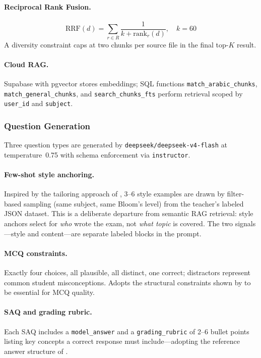 \documentclass[12pt, a4paper]{article}
\begin{document}
\paragraph{Reciprocal Rank Fusion.}
\begin{equation}
  \mathrm{RRF}(d) = \sum_{r \in R} \frac{1}{k + \mathrm{rank}_r(d)},
  \quad k=60
  \label{eq:rrf}
\end{equation}
A diversity constraint caps at two chunks per source file in the final top-$K$ result.

\paragraph{Cloud RAG.}
Supabase \cite{supabase2023} with pgvector stores embeddings; SQL functions
\texttt{match\_arabic\_chunks}, \texttt{match\_general\_chunks}, and
\texttt{search\_chunks\_fts} perform retrieval scoped by \texttt{user\_id}
and \texttt{subject}.

\subsubsection{Question Generation}
\label{subsubsec:generator}

Three question types are generated by \texttt{deepseek/deepseek-v4-flash}
\cite{deepseek2024} at temperature~0.75 with schema enforcement via
\texttt{instructor}.

\paragraph{Few-shot style anchoring.}
Inspired by the tailoring approach of \citet{isley2025quality}, 3--6 style examples
are drawn by filter-based sampling (same subject, same Bloom's level) from the
teacher's labeled JSON dataset. This is a deliberate departure from semantic RAG
retrieval: style anchors select for \textit{who} wrote the exam, not \textit{what
topic} is covered. The two signals---style and content---are separate labeled blocks
in the prompt.

\paragraph{MCQ constraints.}
Exactly four choices, all plausible, all distinct, one correct; distractors represent
common student misconceptions. Adopts the structural constraints shown by
\citet{mucciaccia2025mcq} to be essential for MCQ quality.

\paragraph{SAQ and grading rubric.}
Each SAQ includes a \texttt{model\_answer} and a \texttt{grading\_rubric} of 2--6
bullet points listing key concepts a correct response must include---adopting the
reference answer structure of \citet{morris2024aqg}.
\end{document}
